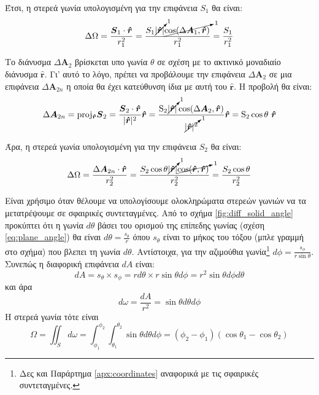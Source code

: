 Έτσι, η στερεά γωνία υπολογισμένη για την επιφάνεια $S_1$ θα είναι:
$$\Delta \Omega = \frac{\boldsymbol{S}_1 \cdot \boldsymbol{\hat{r}}}{r_1^2} = \frac{S_1 \cancelto{1}{|\boldsymbol{\hat{r}}|} \cancelto{1}{\cos(\Delta \boldsymbol{A}_1, \boldsymbol{\hat{r}})}}{r_1^2} = \frac{S_1}{r_1^2}$$

Το διάνυσμα $\Delta \boldsymbol{A}_2$ βρίσκεται υπο γωνία $\theta$ σε σχέση με το ακτινικό μοναδιαίο διάνυσμα $\boldsymbol{\hat{r}}$. Γι' αυτό το λόγο, πρέπει να προβάλουμε την επιφάνεια $\Delta \boldsymbol{A}_2$ σε μια επιφάνεια $\Delta \boldsymbol{A}_{2n}$ η οποία θα έχει κατεύθυνση ίδια με αυτή του $\boldsymbol{\hat{r}}$. Η προβολή θα είναι: $$\Delta \boldsymbol{A}_{2n} = \rm proj_{\boldsymbol{\hat{r}}} \boldsymbol{S}_2 = \frac{\boldsymbol{S}_2 \cdot \boldsymbol{\hat{r}}}{|\boldsymbol{\hat{r}}|^2}\boldsymbol{\hat{r}} = \frac{S_2 \cancelto{1}{|\boldsymbol{\hat{r}}|} \cos (\Delta \boldsymbol{A}_2, \boldsymbol{\hat{r}})}{\cancelto{1}{|\boldsymbol{\hat{r}}|^2}}\boldsymbol{\hat{r}} = S_2 \cos \theta \ \boldsymbol{\hat{r}}$$

Άρα, η στερεά γωνία υπολογισμένη για την επιφάνεια $S_2$ θα είναι:
$$\Delta \Omega = \frac{\Delta \boldsymbol{A}_{2n} \cdot \boldsymbol{\hat{r}}}{r_2^2} = \frac{S_2 \cos \theta \cancelto{1}{|\boldsymbol{\hat{r}}|} \cancelto{1}{\cos (\boldsymbol{\hat{r}}, \boldsymbol{\hat{r}})}}{r_2^2} = \frac{S_2 \cos \theta}{r_2^2}$$



Είναι χρήσιμο όταν θέλουμε να υπολογίσουμε ολοκληρώματα στερεών γωνιών να τα μετατρέψουμε σε σφαιρικές συντεταγμένες. Από το σχήμα \ref{fig:diff_solid_angle} προκύπτει ότι η γωνία $d \theta$ βάσει του ορισμού της επίπεδης γωνίας (σχέση \eqref{eq:plane_angle}) θα είναι $d \theta = \frac{s_{\theta}}{r}$ όπου $s_{\theta}$ είναι το μήκος του τόξου (μπλε γραμμή στο σχήμα) που βλεπει τη γωνία $d \theta$. Αντίστοιχα, για την αζιμούθια γωνία\footnote{Δες και Παράρτημα \ref{apx:coordinates} αναφορικά με τις σφαιρικές συντεταγμένες.} $d \phi = \frac{s_{\phi}}{r \sin \theta}$. Συνεπώς η διαφορική επιφάνεια $dA$ είναι:
$$dA = s_{\theta} \times s_{\phi} = r d\theta \times r \sin \theta d \phi = r^2 \sin \theta d \phi d \theta$$
και άρα 
\begin{equation}
    \label{eq:diff_solid_angle}
    d \omega = \frac{dA}{r^2} = \sin \theta d \theta d \phi
\end{equation}
Η στερεά γωνία τότε είναι
\begin{equation}
    \label{eq:solid_angle_integral}
    \Omega = \iint_S d \omega = \int_{\phi_1}^{\phi_2} \int_{\theta_1}^{\theta_2} \sin \theta d \theta d \phi = (\phi_2 - \phi_1)(\cos \theta_1 - \cos \theta_2)
\end{equation}


